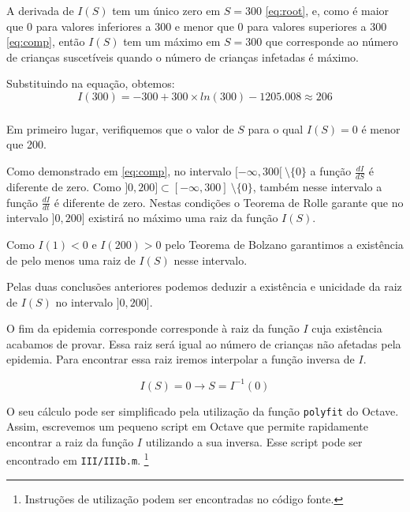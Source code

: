 \documentclass[portuguese, a4paper]{article}
\newcommand\tu[0]{\textunderscore}
\begin{document}
		\par
		A derivada de $I(S)$ tem um único zero em $S = 300$ \eqref{eq:root},
		e, como é maior que 0 para valores inferiores a 300 e menor que 0
		para valores superiores a 300 \eqref{eq:comp}, então $I(S)$ tem um máximo
		em $S = 300$ que corresponde ao número de crianças suscetíveis
		quando o número de crianças infetadas é máximo.

		\par
		Substituindo na equação, obtemos:
		\begin{equation}
			I(300) = -300 + 300 \times ln(300) - 1205.008 \approx 206
		\end{equation}

		\subsubsection{} \label{sec:III.2b)}
		\par
		Em primeiro lugar, verifiquemos que o valor de $S$ para o qual $I(S) = 0$ é menor que 200.

		\par
		Como demonstrado em \eqref{eq:comp}, no intervalo
		$[-\infty,300[~\setminus\{0\}$ a função $\frac{dI}{dS}$ é diferente de
		zero. Como $]0,200] \subset [-\infty,300]~\setminus\{0\}$, também nesse
		intervalo a função $\frac{dI}{dt}$ é diferente de zero. Nestas condições
		o Teorema de Rolle garante que no intervalo $]0,200]$ existirá no máximo
		uma raiz da função $I(S)$.

		\par
		Como $I(1) < 0$ e $I(200) > 0$ pelo Teorema de Bolzano garantimos a
		existência de pelo menos uma raiz de $I(S)$ nesse intervalo.

		\par
		Pelas duas conclusões anteriores podemos deduzir a existência e
		unicidade da raiz de $I(S)$ no intervalo $]0, 200]$.

		\par \null \par
		O fim da epidemia corresponde corresponde à raiz da função $I$ cuja
		existência acabamos de provar. Essa raiz será igual ao número de
		crianças não afetadas pela epidemia. Para encontrar essa raiz iremos
		interpolar a função inversa de $I$.

		\begin{equation}
			I(S) = 0 \rightarrow S = I^{-1}(0)
		\end{equation}

		\par
		O seu cálculo pode ser simplificado pela utilização da função
		\texttt{polyfit} do Octave.  Assim, escrevemos um pequeno script em
		Octave que permite rapidamente encontrar a raiz da função $I$
		utilizando a sua inversa. Esse script pode ser encontrado em
		\texttt{III/III\tu b.m}. \footnote{Instruções de utilização podem ser
		encontradas no código fonte.}
\end{document}
